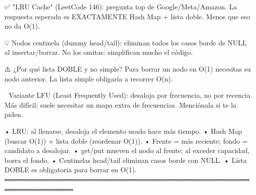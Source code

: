 \begin{dsaentrevistas}

✅ "LRU Cache" (LeetCode 146): pregunta top de Google/Meta/Amazon. La
   respuesta esperada es EXACTAMENTE Hash Map + lista doble. Menos que
   eso no da O(1).

💡 Nodos centinela (dummy head/tail): eliminan todos los casos borde de
   NULL al insertar/borrar. No los omitas: simplifican mucho el código.

⚠️ ¿Por qué lista DOBLE y no simple? Para borrar un nodo en O(1)
   necesitas su nodo anterior. La lista simple obligaría a recorrer O(n).

🔑 Variante LFU (Least Frequently Used): desaloja por frecuencia, no por
   recencia. Más difícil; suele necesitar un mapa extra de frecuencias.
   Menciónala si te la piden.

\end{dsaentrevistas}

\begin{dsaresumen}

• LRU: al llenarse, desaloja el elemento usado hace más tiempo.
• Hash Map (buscar O(1)) + lista doble (reordenar O(1)).
• Frente = más reciente; fondo = candidato a desalojar.
• get/put mueven el nodo al frente; al exceder capacidad, borra el fondo.
• Centinelas head/tail eliminan casos borde con NULL.
• Lista DOBLE es obligatoria para borrar en O(1).
════════════════════════════════════════════════════════════════

\end{dsaresumen}

